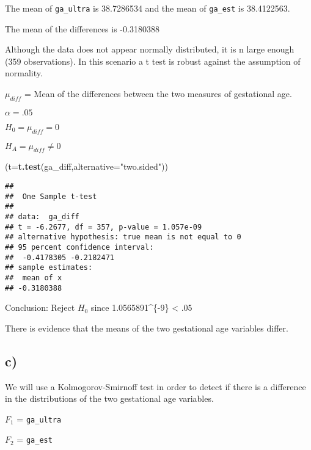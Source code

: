 \documentclass[]{article}
\newenvironment{Shaded}{\begin{snugshade}}{\end{snugshade}}
\newcommand{\KeywordTok}[1]{\textcolor[rgb]{0.13,0.29,0.53}{\textbf{#1}}}
\newcommand{\DataTypeTok}[1]{\textcolor[rgb]{0.13,0.29,0.53}{#1}}
\newcommand{\StringTok}[1]{\textcolor[rgb]{0.31,0.60,0.02}{#1}}
\newcommand{\OperatorTok}[1]{\textcolor[rgb]{0.81,0.36,0.00}{\textbf{#1}}}
\newcommand{\NormalTok}[1]{#1}
\begin{document}
The mean of \texttt{ga\_ultra} is 38.7286534 and the mean of
\texttt{ga\_est} is 38.4122563.

The mean of the differences is -0.3180388

Although the data does not appear normally distributed, it is n large
enough (359 observations). In this scenario a t test is robust against
the assumption of normality.

\(\mu_{diff}\) = Mean of the differences between the two measures of
gestational age.

\(\alpha=.05\)

\(H_0= \mu_{diff}=0\)

\(H_A= \mu_{diff}\neq 0\)

\begin{Shaded}
\begin{Highlighting}[]
\NormalTok{(}\DataTypeTok{t=}\KeywordTok{t.test}\NormalTok{(ga_diff,}\DataTypeTok{alternative=}\StringTok{"two.sided"}\NormalTok{))}
\end{Highlighting}
\end{Shaded}

\begin{verbatim}
## 
##  One Sample t-test
## 
## data:  ga_diff
## t = -6.2677, df = 357, p-value = 1.057e-09
## alternative hypothesis: true mean is not equal to 0
## 95 percent confidence interval:
##  -0.4178305 -0.2182471
## sample estimates:
##  mean of x 
## -0.3180388
\end{verbatim}

\begin{Shaded}
\end{Shaded}

Conclusion: Reject \(H_0\) since 1.0565891\^{}\{-9\}
\textless{} .05

There is evidence that the means of the two gestational age variables
differ.

\subsection{c)}\label{c}

We will use a Kolmogorov-Smirnoff test in order to detect if there is a
difference in the distributions of the two gestational age variables.

\(F_1\) = \texttt{ga\_ultra}

\(F_2\) = \texttt{ga\_est}
\end{document}
